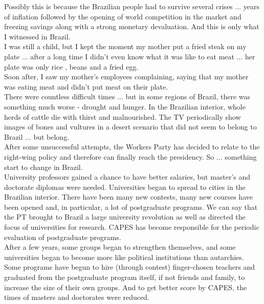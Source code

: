 \documentclass[11pt]{book}
\begin{document}
\noindent Possibly this is because the Brazilian people had to survive several crises ... years of inflation followed by the opening of world competition in the market and freezing savings along with a strong monetary devaluation. And this is only what I witnessed in Brazil. \\

\noindent I was still a child, but I kept the moment my mother put a fried steak on my plate ... after a long time I didn't even know what it was like to eat meat ... her plate was only rice , beans and a fried egg. \\

\noindent Soon after, I saw my mother's employees complaining, saying that my mother was eating meat and didn't put meat on their plate. \\

\noindent There were countless difficult times ... but in some regions of Brazil, there was something much worse - drought and hunger. In the Brazilian interior, whole herds of cattle die with thirst and malnourished. The TV periodically show images of bones and vultures in a desert scenario that did not seem to belong to Brazil ... but belong. \\

\noindent After some unsuccessful attempts, the Workers Party has decided to relate to the right-wing policy and therefore can finally reach the presidency. So ... something start to change in Brazil. \\

\noindent University professors gained a chance to have better salaries, but master's and doctorate diplomas were needed. Universities began to spread to cities in the Brazilian interior. There have been many new contests, many new courses have been opened and, in particular, a lot of postgraduate programs. We can say that the PT brought to Brazil a large university revolution as well as directed the focus of universities for research. CAPES has become responsible for the periodic evaluation of postgraduate programs. \\

\noindent After a few years, some groups began to strengthen themselves, and some universities began to become more like political institutions than autarchies. Some programs have begun to hire (through contest) finger-chosen teachers and graduated from the postgraduate program itself, if not friends and family, to increase the size of their own groups. And to get better score by CAPES, the times of masters and doctorates were reduced. \\ 
\end{document}

